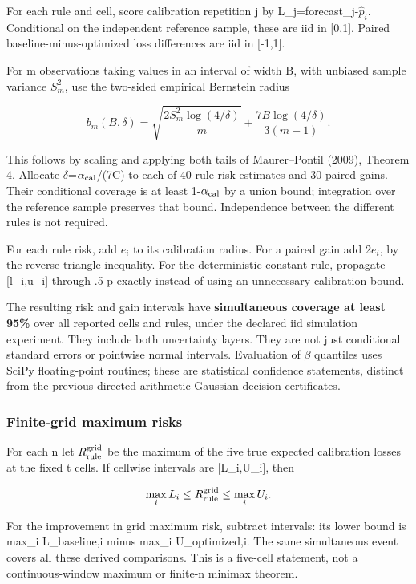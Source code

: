 For each rule and cell, score calibration repetition j by L\_j=\textbar forecast\_j-\(\widehat p_i\)\textbar. Conditional on the independent reference sample, these are iid in {[}0,1{]}. Paired baseline-minus-optimized loss differences are iid in {[}-1,1{]}.

For m observations taking values in an interval of width B, with unbiased sample variance \(S_m^2\), use the two-sided empirical Bernstein radius

\[
b_m(B,\delta)=\sqrt{\frac{2S_m^2\log(4/\delta)}m}
+\frac{7B\log(4/\delta)}{3(m-1)}.
\]

This follows by scaling and applying both tails of Maurer--Pontil (2009), Theorem 4. Allocate \(\delta\)=\(\alpha_{\rm cal}\)/(7C) to each of 40 rule-risk estimates and 30 paired gains. Their conditional coverage is at least 1-\(\alpha_{\rm cal}\) by a union bound; integration over the reference sample preserves that bound. Independence between the different rules is not required.

For each rule risk, add \(e_i\) to its calibration radius. For a paired gain add 2\(e_i\), by the reverse triangle inequality. For the deterministic constant rule, propagate {[}l\_i,u\_i{]} through \textbar.5-p\textbar{} exactly instead of using an unnecessary calibration bound.

The resulting risk and gain intervals have \textbf{simultaneous coverage at least 95\%} over all reported cells and rules, under the declared iid simulation experiment. They include both uncertainty layers. They are not just conditional standard errors or pointwise normal intervals. Evaluation of \(\beta\) quantiles uses SciPy floating-point routines; these are statistical confidence statements, distinct from the previous directed-arithmetic Gaussian decision certificates.

\subsubsection{Finite-grid maximum risks}\label{finite-grid-maximum-risks}

For each n let \(R_{\rm rule}^{\rm grid}\) be the maximum of the five true expected calibration losses at the fixed t cells. If cellwise intervals are {[}L\_i,U\_i{]}, then

\[
\max_iL_i\le R_{\rm rule}^{\rm grid}\le\max_iU_i.
\]

For the improvement in grid maximum risk, subtract intervals: its lower bound is max\_i L\_baseline,i minus max\_i U\_optimized,i. The same simultaneous event covers all these derived comparisons. This is a five-cell statement, not a continuous-window maximum or finite-n minimax theorem.

